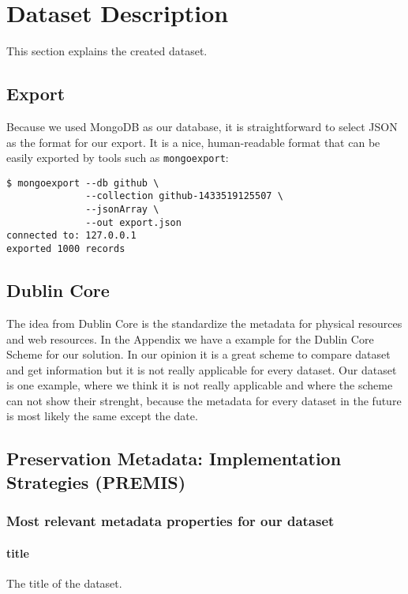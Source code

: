 \section{Dataset Description}\label{sec:dataset-description}

This section explains the created dataset.

\subsection{Export}\label{sec:export}

Because we used MongoDB as our database, it is straightforward to select JSON as the
format for our export. It is a nice, human-readable format that can be easily
exported by tools such as \texttt{mongoexport}:

\begin{lstlisting}
$ mongoexport --db github \
              --collection github-1433519125507 \
              --jsonArray \
              --out export.json
connected to: 127.0.0.1
exported 1000 records
\end{lstlisting}

\subsection{Dublin Core}\label{sec:dublin}

The idea from Dublin Core is the standardize the metadata for physical resources
and web resources. In the Appendix we have a example for the Dublin Core Scheme
for our solution. In our opinion it is a great scheme to compare dataset and get
information but it is not really applicable for every dataset. Our dataset is
one example, where we think it is not really applicable and where the scheme can
not show their strenght, because the metadata for every dataset in the future is
most likely the same except the date. 

\subsection{Preservation Metadata: Implementation Strategies (PREMIS)}\label{sec:premis}


\subsubsection{Most relevant metadata properties for our
dataset}\label{sec:propertielist}

\paragraph{title}
The title of the dataset.
